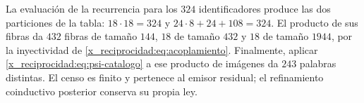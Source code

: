 La evaluación de la recurrencia para los \(324\) identificadores produce
las dos particiones de la tabla: \(18\cdot18=324\) y
\(24\cdot8+24+108=324\). El producto de sus fibras da
\(432\) fibras de tamaño \(144\), \(18\) de tamaño \(432\) y \(18\)
de tamaño \(1944\), por la inyectividad de \eqref{x_reciprocidad:eq:acoplamiento}.
Finalmente, aplicar \eqref{x_reciprocidad:eq:psi-catalogo} a ese producto de imágenes
da \(243\) palabras distintas. El censo es finito y pertenece al emisor
residual; el refinamiento coinductivo posterior conserva su propia ley.

